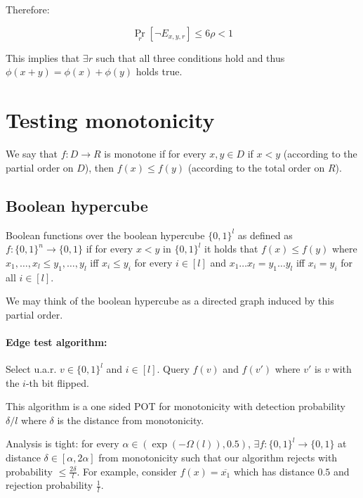 \documentclass{idc_msc}
\begin{document}
Therefore:

\[
  \Pr_r [ \lnot E_{x,y,r} ] \le 6 \rho < 1
\]

This implies that \(\exists r\) such that all three conditions hold and thus \(\phi(x+y) = \phi(x) + \phi(y)\) holds true.

\clearpage
\section{Testing monotonicity}

We say that \(f : D \to R\) is monotone if for every \(x, y \in D\) if \(x < y\) (according to the partial order on \(D\)), then \(f(x) \le f(y)\) (according to the total order on \(R\)).

\subsection{Boolean hypercube}

Boolean functions over the boolean hypercube \(\{0, 1\}^l\) as defined as \(f : \{0, 1\}^n \to \{0, 1\}\) if for every \(x < y\) in \(\{0, 1\}^l\) it holds that \(f(x) \le f(y)\) where \(x_1, \ldots, x_l \le y_1, \ldots, y_l\) iff \(x_i \le y_i\) for every \(i \in [l]\) and \(x_1 \ldots x_l = y_1 \ldots y_l\) iff \(x_i = y_i\) for all \(i \in [l]\).

We may think of the boolean hypercube as a directed graph induced by this partial order.

\paragraph{Edge test algorithm:}

Select u.a.r. \(v \in \{0, 1\}^l\) and \(i \in [l]\).
Query \(f(v)\) and \(f(v')\) where \(v'\) is \(v\) with the \(i\)-th bit flipped.

This algorithm is a one sided POT for monotonicity with detection probability \(\delta / l\) where \(\delta\) is the distance from monotonicity.

Analysis is tight: for every \(\alpha \in (\exp(-\Omega(l)), 0.5)\), \(\exists f : \{0, 1\}^l \to \{0, 1\}\) at distance \(\delta \in [\alpha, 2\alpha]\) from monotonicity such that our algorithm rejects with probability \(\le \frac{2\delta}{l}\).
For example, consider \(f(x) = \overline{x_1}\) which has distance \(0.5\) and rejection probability \(\frac{1}{l}\).
\end{document}

